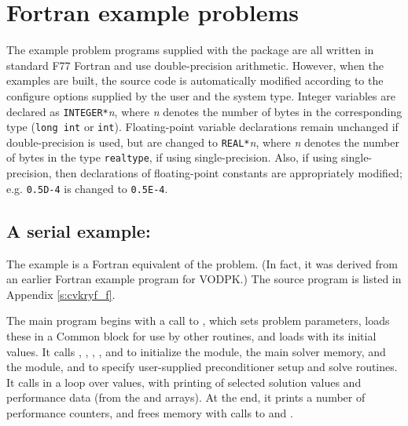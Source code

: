 \section{Fortran example problems}\label{s:ex_fortran}

The {\F} example problem programs supplied with the {\cvode}
package are all written in standard F77 Fortran and use double-precision
arithmetic. However, when the {\F} examples are built, the source code is
automatically modified according to the configure options supplied by the
user and the system type. Integer variables are declared as {\tt INTEGER*}{\em n},
where {\em n} denotes the number of bytes in the corresponding {\C} type
({\tt long int} or {\tt int}). Floating-point variable declarations remain
unchanged if double-precision is used, but are changed to {\tt REAL*}{\em n},
where {\em n} denotes the number of bytes in the {\sundials} type {\tt realtype},
if using single-precision. Also, if using single-precision, then declarations of
floating-point constants are appropriately modified; e.g. {\tt 0.5D-4} is
changed to {\tt 0.5E-4}.


\subsection{A serial example: }\label{ss:cvkryf}

The  example is a Fortran equivalent of the  problem.
(In fact, it was derived from an earlier Fortran example program for VODPK.)
The source program  is listed in Appendix \ref{s:cvkryf_f}.

The main program begins with a call to , which sets problem
parameters, loads these in a Common block for use by other routines, and
loads  with its initial values.  It calls , ,
, , and  to initialize
the {\nvecs} module, the main solver memory, and the {\cvspgmr} module, and
to specify user-supplied preconditioner setup and solve routines.
It calls  in a loop over  values, with printing of
selected solution values and performance data (from the   and 
arrays).  At the end, it prints a number of performance counters, and
frees memory with calls to  and .

